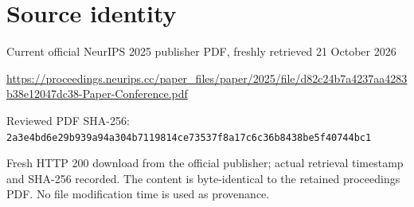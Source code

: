 \documentclass[11pt]{article}
\begin{document}
\section*{Source identity}

Current official NeurIPS 2025 publisher PDF, freshly retrieved 21 October 2026

\url{https://proceedings.neurips.cc/paper_files/paper/2025/file/d82c24b7a4237aa4283b38e12047dc38-Paper-Conference.pdf}

Reviewed PDF SHA-256: \nolinkurl{2a3e4bd6e29b939a94a304b7119814ce73537f8a17c6c36b8438be5f40744bc1}

Fresh HTTP 200 download from the official publisher; actual retrieval timestamp and SHA-256 recorded. The content is byte-identical to the retained proceedings PDF. No file modification time is used as provenance.
\end{document}
